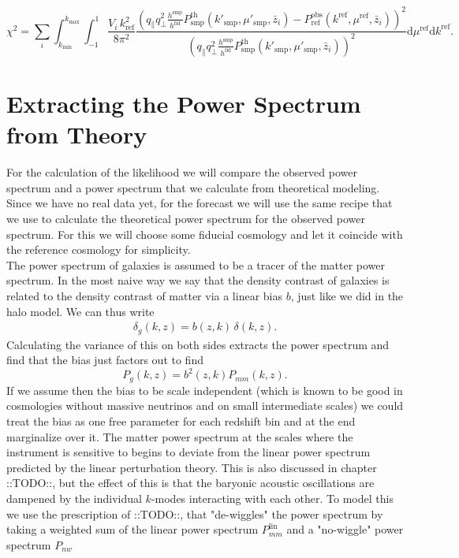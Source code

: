 \documentclass[oneside]{book}
\newcommand*{\rd}{\mathrm{d}}
\newcommand*{\marktodo}{{\color{mmcol} ::TODO::}\xspace}
\begin{document}
\begin{equation}
   \chi^2 = \sum_i \int_{k_\mathrm{min}}^{k_\mathrm{max}} \int_{-1}^{1} \frac{V_i\, k_\mathrm{ref}^2 }{8 \pi^2} 
    \frac{\left( q_\| q_\perp^2 \frac{h^\mathrm{smp}}{h^\mathrm{fid}} P^\mathrm{th}_\mathrm{smp}(k'_\mathrm{smp}, \mu'_\mathrm{smp},\bar{z}_i)
    -P_\mathrm{ref}^\mathrm{obs}(k^\mathrm{ref},\mu^\mathrm{ref},\bar{z}_i)\right)^2}
    {\left(  q_\| q_\perp^2 \frac{h^\mathrm{smp}}{h^\mathrm{fid}} P^\mathrm{th}_\mathrm{smp}(k'_\mathrm{smp}, \mu'_\mathrm{smp},\bar{z}_i) \right)^2} \rd \mu^\mathrm{ref} \rd k^\mathrm{ref}.
\end{equation}  

\section{Extracting the Power Spectrum from Theory}
For the calculation of the likelihood we will compare the observed power spectrum and a power spectrum that we calculate from theoretical modeling. Since we have no real data yet, for the forecast we will use the same recipe that we use to calculate the theoretical power spectrum for the observed power spectrum. For this we will choose some fiducial cosmology and let it coincide with the reference cosmology for simplicity.\\
The power spectrum of galaxies is assumed to be a tracer of the matter power spectrum. In the most naive way we say that the density contrast of galaxies is related to the density contrast of matter via a linear bias $b$, just like we did in the halo model. We can thus write
\begin{align*}
    \delta_g(k,z) = b(z,k)\,\delta(k,z).
\end{align*}
Calculating the variance of this on both sides extracts the power spectrum and find that the bias just factors out to find  
\begin{equation}
    P_g(k,z) = b^2(z,k) P_{mm}(k,z).
\end{equation}
If we assume then the bias to be scale independent (which is known to be good  in cosmologies without massive neutrinos and on small intermediate scales) we could treat the bias as one free parameter for each redshift bin and at the end marginalize over it. The matter power spectrum at the scales where the instrument is sensitive to begins to deviate from the linear power spectrum predicted by the linear perturbation theory. This is also discussed in chapter \marktodo, but the effect of this is that the baryonic acoustic oscillations are dampened by the individual $k$-modes interacting with each other. To model this we use the prescription of  \marktodo, that "de-wiggles" the power spectrum by taking a weighted sum of the linear power spectrum $P_{mm}^\mathrm{lin}$ and a "no-wiggle" power spectrum $P_{nw}$
\end{document}
